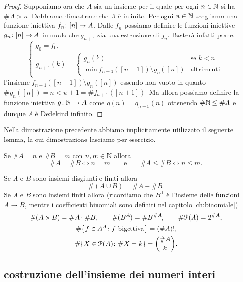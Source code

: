 \begin{proof}
Supponiamo ora che $A$ sia un insieme per il quale per ogni $n\in {\mathbb N}$ 
si ha $\#A > n$. Dobbiamo dimostrare che $A$ è infinito.
Per ogni $n\in {\mathbb N}$ scegliamo%
una funzione iniettiva $f_n\colon{\left[ n \right]}\to A$.
Dalle $f_n$ possiamo definire le funzioni iniettive $g_n\colon {\left[ n \right]}\to A$
in modo che $g_{n+1}$ sia una estensione di $g_n$.
Basterà infatti porre:
\[
  \begin{cases}
  g_0 = f_0,\\
  g_{n+1}(k) = \begin{cases}
    g_n(k) &\text{se $k<n$}\\
    \min f_{n+1}([n+1])\setminus g_n([n]) & \text{altrimenti}
    \end{cases}
  \end{cases}
\]
l'insieme $f_{n+1}([n+1])\setminus g_n([n])$ essendo non vuoto 
in quanto $\# g_n([n]) = n < n+1 = \# f_{n+1}([n+1])$.
Ma allora possiamo definire la funzione iniettiva $g\colon {\mathbb N} \to A$
come $g(n) = g_{n+1}(n)$ ottenendo $\#{\mathbb N} \le \#A$ e dunque $A$ 
è Dedekind infinito.
\end{proof}

Nella dimostrazione precedente abbiamo implicitamente utilizzato il seguente lemma,
la cui dimostrazione lasciamo per esercizio.
\begin{lemma}
  Se $\#A = n$ e $\#B = m$ con $n,m\in {\mathbb N}$ allora 
  \[
    \#A = \#B \iff n=m
    \qquad \text{e}\qquad
    \#A \le \#B \iff n \le m.
  \]
\end{lemma}


\begin{exercise}
  \label{th:combinatoria}
  Se $A$ e $B$ sono insiemi disgiunti e finiti allora  
  \[
    \#(A\cup B) = \#A + \#B.
  \]
  Se $A$ e $B$ sono insiemi finiti allora 
  (ricordiamo che $B^A$ è l'insieme delle funzioni $A\to B$,
  mentre i coefficienti binomiali sono definiti nel capitolo
  \ref{ch:binomiale})
  \begin{gather*}
    \#(A \times B) = \#A\cdot \#B, \qquad
    \#(B^A) = \#B^{\#A}, \qquad
    \#\mathcal P(A) = 2^{\# A}, \\
    \#{\left\{ f\in A^A\colon \text{$f$ bigettiva} \right\}} = (\#A)!, \\
     \#{\left\{ X\in \mathcal P(A)\colon \#X = k \right\}}  
     = {\#A \choose k}. 
  \end{gather*}
\end{exercise}

\subsection{costruzione dell'insieme dei numeri interi}

